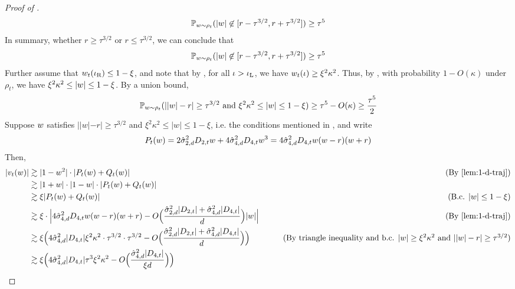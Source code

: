 \begin{proof}[Proof of ]
\begin{align}
\mathbb{P}_{w \sim \rho_t}(|w| \not\in [r - \tau^{3/2}, r + \tau^{3/2}]) \geq \tau^5
\end{align}
In summary, whether $r \geq \tau^{3/2}$ or $r \leq \tau^{3/2}$, we can conclude that
\begin{align}
\mathbb{P}_{w \sim \rho_t}(|w| \not\in [r - \tau^{3/2}, r + \tau^{3/2}]) \geq \tau^5
\end{align}
Further assume that $w_t(\iota_{\textup{R}}) \leq 1 - \xi$, and note that by , for all $\iota > \iota_{\textup{L}}$, we have $w_t(\iota) \geq \xi^2 \kappa^2$. Thus, by , with probability $1 - O(\kappa)$ under $\rho_t$, we have $\xi^2 \kappa^2 \leq |w| \leq 1 - \xi$. By a union bound, 
\begin{align} \label{eq:w_large_away_from_root_prob}
\mathbb{P}_{w \sim \rho_t}(||w| - r| \geq \tau^{3/2} \text{ and }\xi^2 \kappa^2 \leq |w| \leq 1 - \xi)
 \geq \tau^5 - O(\kappa) 
 \geq \frac{\tau^5}{2}
\end{align}
Suppose $w$ satisfies $||w| - r| \geq \tau^{3/2}$ and $\xi^2 \kappa^2 \leq |w| \leq 1 - \xi$, i.e. the conditions mentioned in , and write
\begin{align}
P_t(w)
 = 2 \hat{\sigma}_{2, d}^2 D_{2, t} w + 4 \hat{\sigma}_{4, d}^2 D_{4, t} w^3 
 = 4 \hat{\sigma}_{4, d}^2 D_{4, t} w (w - r) (w + r)
\end{align}
Then,
\begin{align}
|\vel_t(\w)|
& \gtrsim |1 - \w^2| \cdot |P_t(\w) + Q_t(\w)|
& \tag{By \Cref{lem:1-d-traj}} \\
& \gtrsim |1 + \w| \cdot |1 - \w| \cdot |P_t(\w) + Q_t(\w)| \\
& \gtrsim \xi |P_t(\w) + Q_t(\w)|
& \tag{B.c. $|\w| \leq 1 - \xi$} \\
& \gtrsim \xi \cdot \Big| 4 \sigmaCoeffFour^2 D_{4, t} \w (\w - r)(\w + r) - O\Big(\frac{\sigmaCoeffTwo^2 |D_{2, t}| + \sigmaCoeffFour^2 |D_{4, t}|}{d}\Big) |\w| \Big| 
& \tag{By \Cref{lem:1-d-traj}} \\
& \gtrsim \xi \Big(4 \sigmaCoeffFour^2 |D_{4, t}| \xi^2 \kappa^2 \cdot \tau^{3/2} \cdot \tau^{3/2} - O\Big(\frac{\sigmaCoeffTwo^2 |D_{2, t}| + \sigmaCoeffFour^2 |D_{4, t}|}{d}\Big)\Big)
& \tag{By triangle inequality and b.c. $|w| \geq \xi^2 \kappa^2$ and $||\w| - r| \geq \tau^{3/2}$} \\
& \gtrsim \xi \Big(4 \sigmaCoeffFour^2 |D_{4, t}| \tau^3 \xi^2 \kappa^2 - O\Big(\frac{\sigmaCoeffFour^2 |D_{4, t}|}{\xi d}\Big)\Big)

\end{align}
\end{proof}
